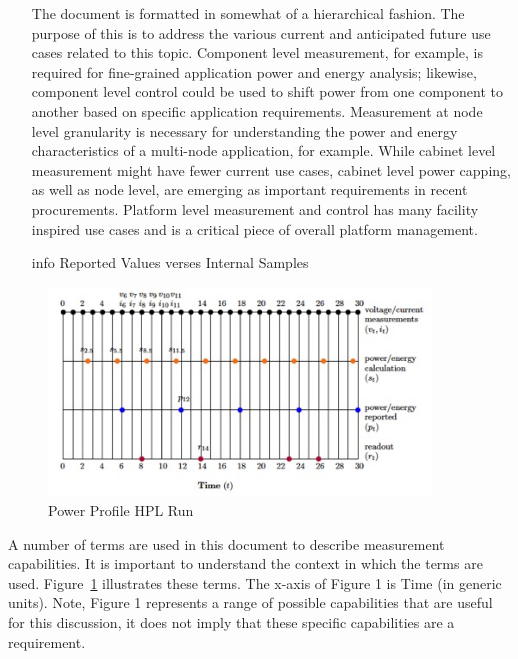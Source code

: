 \begin{itemize}
	The document is formatted in somewhat of a hierarchical fashion. The purpose of this is to address the various current and anticipated future use cases related to this topic. Component level measurement, for example, is required for fine-grained application power and energy analysis; likewise, component level control could be used to shift power from one component to another based on specific application requirements. Measurement at node level granularity is necessary for understanding the power and energy characteristics of a multi-node application, for example. While cabinet level measurement might have fewer current use cases, cabinet level power capping, as well as node level, are emerging as important requirements in recent procurements. Platform level measurement and control has many facility inspired use cases and is a critical piece of overall platform management.

\item[{info}]
Reported Values verses Internal Samples
\end{itemize}

\begin{figure}
\centering
\includegraphics[width=4in]{fig1}
\caption{Power Profile HPL Run}
\label{fig:powprof}
\end{figure}

A number of terms are used in this document to describe measurement capabilities. It is important to understand the context in which the terms are used. Figure~\ref{fig:powprof} illustrates these terms. The x-axis of Figure 1 is Time (in generic units). Note, Figure 1 represents a range of possible capabilities that are useful for this discussion, it does not imply that these specific capabilities are a requirement.

